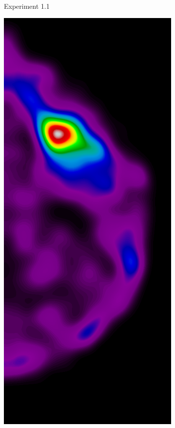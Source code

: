 \begin{figure}[h!]
\begin{subfigure}{0.195\textwidth}
		\caption{Experiment 1.1}
    \end{subfigure}
	\begin{subfigure}{0.195\textwidth}
		\centering
			\includegraphics[width=\textwidth]{plots/examples/example2_probs_1_2.png}

\end{subfigure}
\end{figure}
